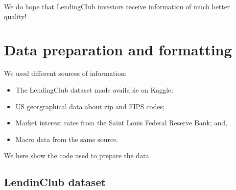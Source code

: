 \documentclass[11pt,]{report}
\begin{document}
We do hope that LendingClub investors receive information of much better quality!

\hypertarget{data-preparation-and-formatting}{%
\section{Data preparation and formatting}\label{data-preparation-and-formatting}}

We used different sources of information:

\begin{itemize}
\item
  The LendingClub dataset made available on Kaggle;
\item
  US georgraphical data about zip and FIPS codes;
\item
  Market interest rates from the Saint Louis Federal Reserve Bank; and,
\item
  Macro data from the same source.
\end{itemize}

We here show the code used to prepare the data.

\hypertarget{lendinclub-dataset}{%
\subsection{LendinClub dataset}\label{lendinclub-dataset}}

\small
\end{document}
